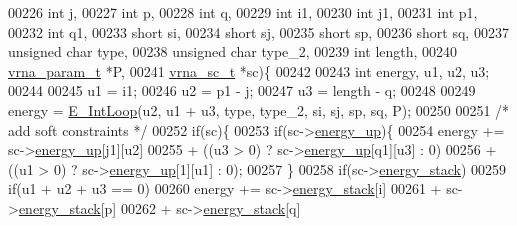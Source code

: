 \begin{DoxyCode}
00226                       \textcolor{keywordtype}{int} j,
00227                       \textcolor{keywordtype}{int} p,
00228                       \textcolor{keywordtype}{int} q,
00229                       \textcolor{keywordtype}{int} i1,
00230                       \textcolor{keywordtype}{int} j1,
00231                       \textcolor{keywordtype}{int} p1,
00232                       \textcolor{keywordtype}{int} q1,
00233                       \textcolor{keywordtype}{short} si,
00234                       \textcolor{keywordtype}{short} sj,
00235                       \textcolor{keywordtype}{short} sp,
00236                       \textcolor{keywordtype}{short} sq,
00237                       \textcolor{keywordtype}{unsigned} \textcolor{keywordtype}{char} type,
00238                       \textcolor{keywordtype}{unsigned} \textcolor{keywordtype}{char} type\_2,
00239                       \textcolor{keywordtype}{int} length,
00240                       \hyperlink{group__energy__parameters_structvrna__param__s}{vrna\_param\_t} *P,
00241                       \hyperlink{group__soft__constraints_structvrna__sc__s}{vrna\_sc\_t} *sc)\{
00242 
00243   \textcolor{keywordtype}{int} energy, u1, u2, u3;
00244   
00245   u1 = i1;
00246   u2 = p1 - j;
00247   u3 = length - q;
00248 
00249   energy = \hyperlink{group__loops_gaafbc187b7f78e8e82afb77dd6f3b8fc5}{E\_IntLoop}(u2, u1 + u3, type, type\_2, si, sj, sp, sq, P);
00250 
00251   \textcolor{comment}{/* add soft constraints */}
00252   \textcolor{keywordflow}{if}(sc)\{
00253     \textcolor{keywordflow}{if}(sc->\hyperlink{group__soft__constraints_a57e4dbb924ab11f304e3762a3a9b07a1}{energy\_up})\{
00254       energy += sc->\hyperlink{group__soft__constraints_a57e4dbb924ab11f304e3762a3a9b07a1}{energy\_up}[j1][u2]
00255                 + ((u3 > 0) ? sc->\hyperlink{group__soft__constraints_a57e4dbb924ab11f304e3762a3a9b07a1}{energy\_up}[q1][u3] : 0)
00256                 + ((u1 > 0) ? sc->\hyperlink{group__soft__constraints_a57e4dbb924ab11f304e3762a3a9b07a1}{energy\_up}[1][u1] : 0);
00257     \}
00258     \textcolor{keywordflow}{if}(sc->\hyperlink{group__soft__constraints_ac20dded6068e81acd0f1139092f66a22}{energy\_stack})
00259       \textcolor{keywordflow}{if}(u1 + u2 + u3 == 0)
00260         energy +=   sc->\hyperlink{group__soft__constraints_ac20dded6068e81acd0f1139092f66a22}{energy\_stack}[i]
00261                   + sc->\hyperlink{group__soft__constraints_ac20dded6068e81acd0f1139092f66a22}{energy\_stack}[p]
00262                   + sc->\hyperlink{group__soft__constraints_ac20dded6068e81acd0f1139092f66a22}{energy\_stack}[q]

\end{DoxyCode}
